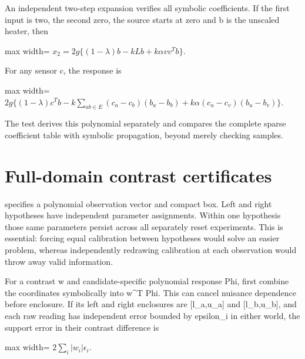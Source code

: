 \documentclass[
  11pt,
  a4paper,
]{report}
\let\singularitytexttt\texttt
\renewcommand{\texttt}[1]{\singularitytexttt{\seqsplit{#1}}}
\begin{document}
An independent two-step expansion verifies all symbolic coefficients. If
the first input is two, the second zero, the source starts at zero and b
is the unscaled heater, then

\begin{center}
\begin{adjustbox}{max width=\linewidth}
$\displaystyle
x_2=2g\{(1-\lambda)b-kLb+k\alpha vv^Tb\}.
$
\end{adjustbox}
\end{center}

For any sensor c, the response is

\begin{center}
\begin{adjustbox}{max width=\linewidth}
$\displaystyle
2g\{(1-\lambda)c^Tb-k\sum_{ab\in E}(c_a-c_b)(b_a-b_b)
+k\alpha(c_u-c_v)(b_u-b_v)\}.
$
\end{adjustbox}
\end{center}

The test derives this polynomial separately and compares the complete
sparse coefficient table with symbolic propagation, beyond merely
checking samples.

\hypertarget{full-domain-contrast-certificates}{%
\section{Full-domain contrast
certificates}\label{full-domain-contrast-certificates}}

\texttt{ParametricFaultFamily} specifies a polynomial observation vector
and compact box. Left and right hypotheses have independent parameter
assignments. Within one hypothesis those same parameters persist across
all separately reset experiments. This is essential: forcing equal
calibration between hypotheses would solve an easier problem, whereas
independently redrawing calibration at each observation would throw away
valid information.

For a contrast w and candidate-specific polynomial response Phi, first
combine the coordinates symbolically into w\textasciicircum{}T Phi. This can cancel
nuisance dependence before enclosure. If its left and right enclosures
are {[}l\_a,u\_a{]} and {[}l\_b,u\_b{]}, and each raw reading has
independent error bounded by epsilon\_i in either world, the support
error in their contrast difference is

\begin{center}
\begin{adjustbox}{max width=\linewidth}
$\displaystyle
2\sum_i|w_i|\epsilon_i.
$
\end{adjustbox}
\end{center}
\end{document}
